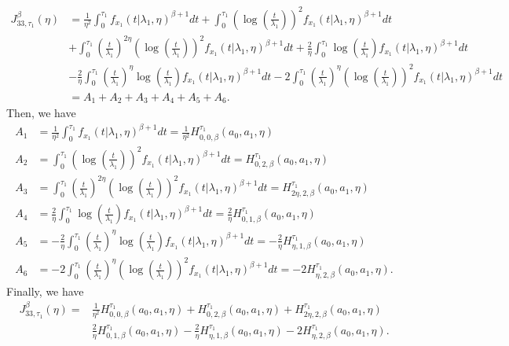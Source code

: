\documentclass{article}
\begin{document}
\begin{align*}
J_{33,\tau_1}^{\beta}(\eta)&=\frac{1}{\eta^2}\int_{0}^{\tau_1}f_{x_1}(t|\lambda_1,\eta)^{\beta+1}dt+\int_{0}^{\tau_1}\left(\log\left(\frac{t}{\lambda_1}\right)\right)^2f_{x_1}(t|\lambda_1,\eta)^{\beta+1}dt
\\
&+\int_{0}^{\tau_1}\left(\frac{t}{\lambda_1}\right)^{2\eta}\left(\log\left(\frac{t}{\lambda_1}\right)\right)^2f_{x_1}(t|\lambda_1,\eta)^{\beta+1}dt+\frac{2}{\eta}\int_{0}^{\tau_1}\log\left(\frac{t}{\lambda_1}\right)f_{x_1}(t|\lambda_1,\eta)^{\beta+1}dt
\\
&-\frac{2}{\eta}\int_{0}^{\tau_1}\left(\frac{t}{\lambda_1}\right)^{\eta}\log\left(\frac{t}{\lambda_1}\right)f_{x_1}(t|\lambda_1,\eta)^{\beta+1}dt-2\int_{0}^{\tau_1}\left(\frac{t}{\lambda_1}\right)^{\eta}\left(\log\left(\frac{t}{\lambda_1}\right)\right)^{2}f_{x_1}(t|\lambda_1,\eta)^{\beta+1}dt
\\
&=A_1+A_2+A_3+A_4+A_5+A_6.
\end{align*}
Then, we have
\begin{align*}
A_1&=\frac{1}{\eta^2}\int_{0}^{\tau_1}f_{x_1}(t|\lambda_1,\eta)^{\beta+1}dt=\frac{1}{\eta^2}H_{0,0,\beta}^{\tau_1}(a_0,a_1,\eta)
\\
A_2&=\int_{0}^{\tau_1}\left(\log\left(\frac{t}{\lambda_1}\right)\right)^2f_{x_1}(t|\lambda_1,\eta)^{\beta+1}dt=H_{0,2,\beta}^{\tau_1}(a_0,a_1,\eta)
\\
A_3&=\int_{0}^{\tau_1}\left(\frac{t}{\lambda_1}\right)^{2\eta}\left(\log\left(\frac{t}{\lambda_1}\right)\right)^2f_{x_1}(t|\lambda_1,\eta)^{\beta+1}dt=H_{2\eta,2,\beta}^{\tau_1}(a_0,a_1,\eta)
 \\
 A_4&=\frac{2}{\eta}\int_{0}^{\tau_1}\log\left(\frac{t}{\lambda_1}\right)f_{x_1}(t|\lambda_1,\eta)^{\beta+1}dt=\frac{2}{\eta}H_{0,1,\beta}^{\tau_1}(a_0,a_1,\eta)
 \\
 A_5&=-\frac{2}{\eta}\int_{0}^{\tau_1}\left(\frac{t}{\lambda_1}\right)^{\eta}\log\left(\frac{t}{\lambda_1}\right)f_{x_1}(t|\lambda_1,\eta)^{\beta+1}dt=-\frac{2}{\eta}H_{\eta,1,\beta}^{\tau_1}(a_0,a_1,\eta)
 \\
 A_6&=-2\int_{0}^{\tau_1}\left(\frac{t}{\lambda_1}\right)^{\eta}\left(\log\left(\frac{t}{\lambda_1}\right)\right)^{2}f_{x_1}(t|\lambda_1,\eta)^{\beta+1}dt=-2H_{\eta,2,\beta}^{\tau_1}(a_0,a_1,\eta).
\end{align*}
Finally, we have
\begin{align*}
J_{33,\tau_1}^{\beta}(\eta)=&\frac{1}{\eta^2}H_{0,0,\beta}^{\tau_1}(a_0,a_1,\eta)+H_{0,2,\beta}^{\tau_1}(a_0,a_1,\eta)+H_{2\eta,2,\beta}^{\tau_1}(a_0,a_1,\eta)
\\
&\frac{2}{\eta}H_{0,1,\beta}^{\tau_1}(a_0,a_1,\eta)-\frac{2}{\eta}H_{\eta,1,\beta}^{\tau_1}(a_0,a_1,\eta)-2H_{\eta,2,\beta}^{\tau_1}(a_0,a_1,\eta).
\end{align*}
\end{document}
